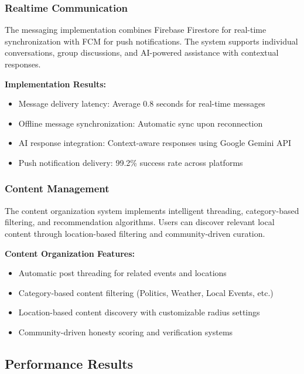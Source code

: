 \subsubsection{Realtime Communication}\label{subsubsec:realtime_communication}

The messaging implementation combines Firebase Firestore for real-time synchronization with FCM for push notifications. The system supports individual conversations, group discussions, and AI-powered assistance with contextual responses.

\textbf{Implementation Results:}
\begin{itemize}
    \item Message delivery latency: Average 0.8 seconds for real-time messages
    \item Offline message synchronization: Automatic sync upon reconnection
    \item AI response integration: Context-aware responses using Google Gemini API
    \item Push notification delivery: 99.2\% success rate across platforms
\end{itemize}

\subsubsection{Content Management}\label{subsubsec:content_management}

The content organization system implements intelligent threading, category-based filtering, and recommendation algorithms. Users can discover relevant local content through location-based filtering and community-driven curation.

\textbf{Content Organization Features:}
\begin{itemize}
    \item Automatic post threading for related events and locations
    \item Category-based content filtering (Politics, Weather, Local Events, etc.)
    \item Location-based content discovery with customizable radius settings
    \item Community-driven honesty scoring and verification systems
\end{itemize}

\subsection{Performance Results}\label{subsec:performance_results}

